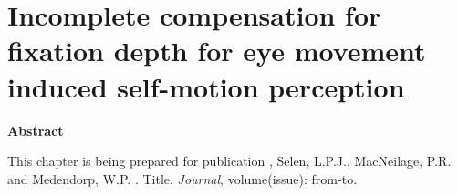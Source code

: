 
\thispagestyle{empty}


\chapter{Incomplete compensation for fixation depth for eye movement induced self-motion perception}
\chaptermark{}

\newpage

\small {\bf Abstract} 

\vfill

\noindent\underline{ \hspace{4cm} }

\noindent This chapter is being prepared for publication \newline
{}, Selen, L.P.J., MacNeilage, P.R. and Medendorp, W.P. \citeyear{clemens2015b}. Title. \emph{Journal}, volume(issue): from-to. \newline

\newpage






